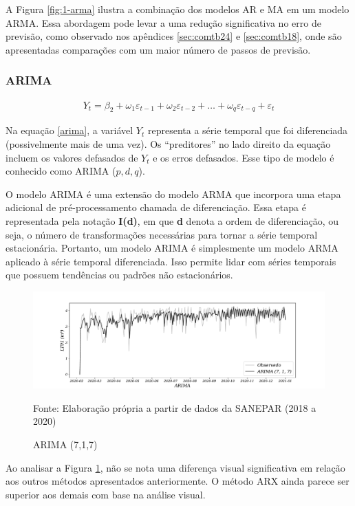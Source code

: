 A Figura \ref{fig:1-arma} ilustra a combinação dos modelos AR e MA em um modelo ARMA. Essa abordagem pode levar a uma redução significativa no erro de previsão, como observado nos apêndices \ref{sec:comtb24} e \ref{sec:comtb18}, onde são apresentadas comparações com um maior número de passos de previsão.

\subsubsection{ARIMA}

\begin{eqnarray}
	Y_t = \beta_2 + \omega_1\varepsilon_{t-1} + \omega_2 \varepsilon_{t-2} +\ldots+ \omega_q \varepsilon_{t-q} + \varepsilon_t \label{arima}
\end{eqnarray}

Na equação \eqref{arima}, a variável $Y_t$ representa a série temporal que foi diferenciada (possivelmente mais de uma vez). Os ``preditores'' no lado direito da equação incluem os valores defasados de $Y_t$ e os erros defasados. Esse tipo de modelo é conhecido como ARIMA ($p, d, q$).

O modelo ARIMA é uma extensão do modelo ARMA que incorpora uma etapa adicional de pré-processamento chamada de diferenciação. Essa etapa é representada pela notação \textbf{I(d)}, em que \textbf{d} denota a ordem de diferenciação, ou seja, o número de transformações necessárias para tornar a série temporal estacionária. Portanto, um modelo ARIMA é simplesmente um modelo ARMA aplicado à série temporal diferenciada. Isso permite lidar com séries temporais que possuem tendências ou padrões não estacionários.

\begin{figure}[!htb]
	\centering
	\caption{ARIMA (7,1,7)}
	\label{fig:1-arima}
	\includegraphics[width=1\linewidth]{Modelos/Figuras/ARIMA}
	
	Fonte: Elaboração própria a partir de dados da SANEPAR (2018 a 2020)
\end{figure}

Ao analisar a Figura \ref{fig:1-arima}, não se nota uma diferença visual significativa em relação aos outros métodos apresentados anteriormente. O método ARX ainda parece ser superior aos demais com base na análise visual.

